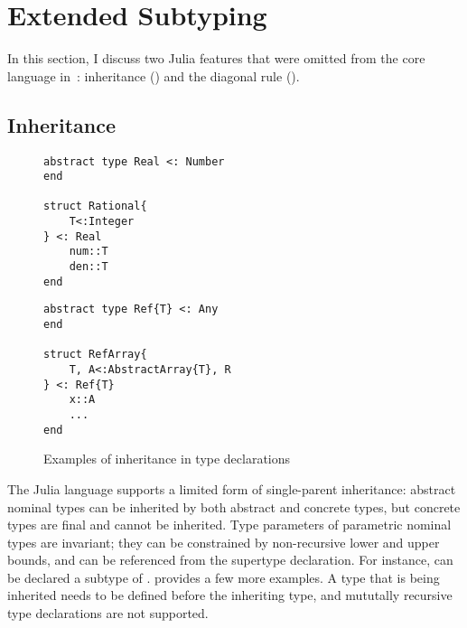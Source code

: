 \section{Extended Subtyping}

In this section, I discuss two Julia features that were
omitted from the core language in~:
inheritance () and
the diagonal rule ().

\subsection{Inheritance}\label{subsec:dec-sub:inheritance}

\begin{figure}[t] 
\begin{minipage}{5cm}
\begin{lstlisting}
abstract type Real <: Number
end

struct Rational{
    T<:Integer
} <: Real
    num::T
    den::T
end
\end{lstlisting}
\end{minipage}
\hspace{1cm}
\begin{minipage}{5cm}
\begin{lstlisting}
abstract type Ref{T} <: Any
end

struct RefArray{
    T, A<:AbstractArray{T}, R
} <: Ref{T}
    x::A
    ...
end
\end{lstlisting}  
\end{minipage}
\caption{Examples of inheritance in type declarations
}\label{fig:code:inheritance}
\end{figure}

The Julia language supports a limited form of single-parent inheritance:
abstract nominal types can be inherited by both abstract and concrete
types, but concrete types are final and cannot be inherited.
Type parameters of parametric nominal types are invariant;
they can be constrained by non-recursive lower and upper bounds,
and can be referenced from the supertype declaration.
For instance,  can be declared a subtype of
.
 provides a few more examples.
A type that is being inherited needs to be defined before the inheriting type,
and mututally recursive type declarations are not supported.


